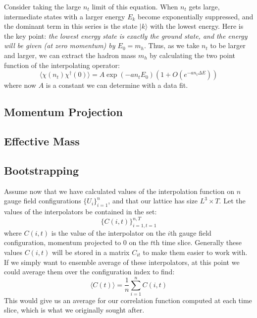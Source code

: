 \documentclass[11pt, oneside]{article}   	%
\theoremstyle{definition}
\begin{document}
Consider taking the large $n_t$ limit of this equation. When $n_t$ gets large, intermediate states with a larger 
energy $E_k$ become exponentially suppressed, and the dominant term in this series is the state $|k\rangle$ 
with the lowest energy. Here is the key point: \textit{the lowest energy state is exactly the ground state, and the 
energy will be given (at zero momentum) by $E_0 = m_h$}. Thus, as we take $n_t$ to be larger and larger, 
we can extract the hadron mass $m_h$ by calculating the two point function of the interpolating operator:
\begin{equation}
	\langle\chi(n_t)\chi^\dagger(0)\rangle = A\exp(-a n_t E_0)(1 + O(e^{-an_t\Delta E}))
\end{equation}
where now $A$ is a constant we can determine with a data fit. 

\subsection{Momentum Projection}

\subsection{Effective Mass}

\subsection{Bootstrapping}

Assume now that we have calculated values of the interpolation function on $n$ gauge field configurations 
$\{U_i\}_{i = 1}^n$, and that our lattice has size $L^3\times T$. Let the values of the interpolators be 
contained in the set:
\begin{equation}
	\{C(i, t)\}_{i = 1, t = 1}^{n, T}
\end{equation}
where $C(i, t)$ is the value of the interpolator on the $i$th gauge field configuration, momentum projected 
to 0 on the $t$th time slice. Generally these values $C(i, t)$ will be stored in a matrix $C_{it}$ to make them 
easier to work with. If we simply want to ensemble average of these interpolators, at this point we could 
average them over the configuration index to find:
\begin{equation}
	\langle C(t)\rangle = \frac{1}{n}\sum_{i = 1}^n C(i, t)
\end{equation}
This would give us an average for our correlation function computed at each time slice, which is what we 
originally sought after.
\end{document}
